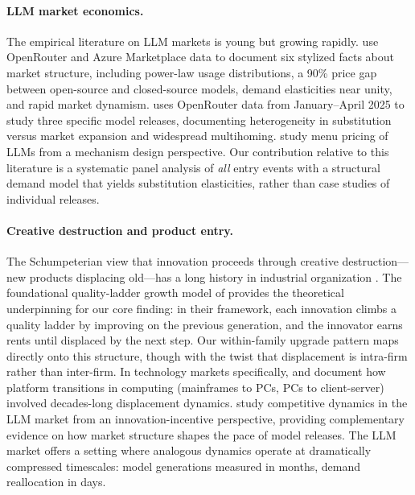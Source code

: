 \documentclass[11pt, a4paper]{article}
\begin{document}
\paragraph{LLM market economics.} The empirical literature on LLM markets is young but growing rapidly. \citet{demirer2025emerging} use OpenRouter and Azure Marketplace data to document six stylized facts about market structure, including power-law usage distributions, a 90\% price gap between open-source and closed-source models, demand elasticities near unity, and rapid market dynamism. \citet{fradkin2025demand} uses OpenRouter data from January--April 2025 to study three specific model releases, documenting heterogeneity in substitution versus market expansion and widespread multihoming. \citet{chenRoskillWilliams2025menu} study menu pricing of LLMs from a mechanism design perspective. Our contribution relative to this literature is a systematic panel analysis of \emph{all} entry events with a structural demand model that yields substitution elasticities, rather than case studies of individual releases.

\paragraph{Creative destruction and product entry.} The Schumpeterian view that innovation proceeds through creative destruction---new products displacing old---has a long history in industrial organization \citep{arrow1962economic, reinganum1983uncertain, grossman1991innovation, aghion2005competition}. The foundational quality-ladder growth model of \citet{aghion1992model} provides the theoretical underpinning for our core finding: in their framework, each innovation climbs a quality ladder by improving on the previous generation, and the innovator earns rents until displaced by the next step. Our within-family upgrade pattern maps directly onto this structure, though with the twist that displacement is intra-firm rather than inter-firm. In technology markets specifically, \citet{bresnahan1999technological} and \citet{bresnahan2011schumpeterian} document how platform transitions in computing (mainframes to PCs, PCs to client-server) involved decades-long displacement dynamics. \citet{zheng2024competition} study competitive dynamics in the LLM market from an innovation-incentive perspective, providing complementary evidence on how market structure shapes the pace of model releases. The LLM market offers a setting where analogous dynamics operate at dramatically compressed timescales: model generations measured in months, demand reallocation in days.
\end{document}
